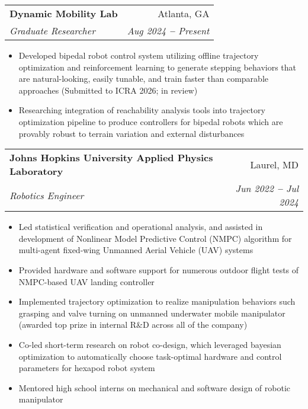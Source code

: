 \documentclass[letterpaper,11pt]{article}
\makeatletter
\newcommand{\resumeItem}[1]{
  \item\small{
    {#1 \vspace{-2pt}}
  }
}
\newcommand{\resumeSubheading}[4]{
  \vspace{-2pt}\item
    \begin{tabular*}{0.97\textwidth}[t]{l@{\extracolsep{\fill}}r}
      \textbf{#1} & #2 \\
      \textit{\small#3} & \textit{\small #4} \\
    \end{tabular*}\vspace{-7pt}
}
\newcommand{\resumeItemListStart}{\begin{itemize}}
\newcommand{\resumeItemListEnd}{\end{itemize}\vspace{-5pt}}
\makeatother
\begin{document}
    \resumeSubheading
      {Dynamic Mobility Lab}{Atlanta, GA}
      {Graduate Researcher}{Aug 2024 \textbf{--} Present}
      \resumeItemListStart
        \resumeItem{Developed bipedal robot control system utilizing offline trajectory optimization and reinforcement learning to generate stepping behaviors that are 
        natural-looking, easily tunable, and train faster than comparable approaches (Submitted to ICRA 2026; in review)}
        \resumeItem{Researching integration of reachability analysis tools into trajectory optimization pipeline to produce controllers for bipedal robots which are 
        provably robust to terrain variation and external disturbances}
      \resumeItemListEnd
    \resumeSubheading
      {Johns Hopkins University Applied Physics Laboratory}{Laurel, MD}
      {Robotics Engineer}{Jun 2022 \textbf{--} Jul 2024}
        \resumeItemListStart
      \resumeItem{Led statistical verification and operational analysis, and assisted in development of Nonlinear Model Predictive Control (NMPC) algorithm for
      multi-agent fixed-wing Unmanned Aerial Vehicle (UAV) systems}
      \resumeItem{Provided hardware and software support for numerous outdoor flight tests of NMPC-based UAV landing controller}
      \resumeItem{Implemented trajectory optimization to realize manipulation behaviors such grasping and valve turning on
      unmanned underwater mobile manipulator (awarded top prize in internal R\&D across all of the company)}
      \resumeItem{Co-led short-term research on robot co-design, which leveraged bayesian optimization to automatically choose 
      task-optimal hardware and control parameters for hexapod robot system}
      \resumeItem{Mentored high school interns on mechanical and software design
      of robotic manipulator}
    \resumeItemListEnd
    
\end{document}

